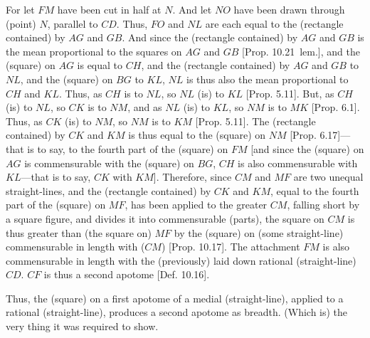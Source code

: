 \begin{Parallel}{}{}
{For let $FM$ have been cut in half at $N$. And let $NO$ have been drawn
through (point) $N$, parallel to $CD$. Thus, $FO$ and
$NL$ are each equal to the (rectangle contained) by $AG$ and $GB$.
And since
the (rectangle contained) by $AG$ and $GB$ is the mean
proportional to the squares on $AG$ and $GB$ [Prop. 10.21~lem.], and the (square) on $AG$
is equal to $CH$, and the (rectangle contained) by $AG$ and
$GB$ to $NL$, and the (square) on $BG$ to $KL$,  $NL$ is thus also the
mean proportional to $CH$ and $KL$. Thus, as $CH$ is to $NL$, so
$NL$ (is) to $KL$ [Prop. 5.11]. But, as $CH$ (is) to $NL$, so $CK$ is to
$NM$, and as $NL$ (is) to $KL$, so $NM$ is to $MK$
[Prop. 6.1]. Thus, as $CK$ (is) to $NM$, so $NM$
is to $KM$ [Prop. 5.11]. The (rectangle contained) by  $CK$ and $KM$ is thus
equal to the (square) on $NM$ [Prop. 6.17]---that is to say, to the fourth part of the
(square) on $FM$ [and since the (square) on $AG$ is commensurable
with the (square) on $BG$, $CH$ is also commensurable with $KL$---that is to say, $CK$ with $KM$].  Therefore, since $CM$ and $MF$ are two
unequal straight-lines, and the (rectangle contained) by $CK$ and
$KM$, equal to the fourth part
of the (square) on $MF$,  has been applied to the greater $CM$,
falling short by a square figure, and divides it into commensurable
(parts), the square on $CM$ is thus greater than (the square on)
$MF$ by the (square) on (some straight-line) commensurable
in length with ($CM$) [Prop. 10.17]. The
attachment $FM$ is also commensurable in length with the (previously)
laid down rational (straight-line) $CD$. $CF$ is thus a second apotome [Def. 10.16].

Thus, the (square) on a first apotome of
a medial (straight-line), applied to a rational (straight-line), produces
 a second apotome as breadth. (Which is) the very thing it was required to
show.}
\end{Parallel}

